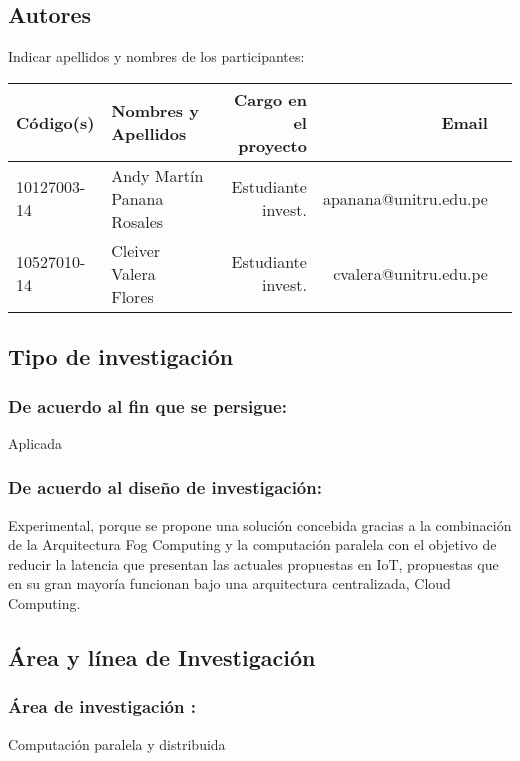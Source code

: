 \subsection{Autores}
Indicar apellidos y nombres de los participantes:
\begin{center}
    \begin{table}[!ht]
        \centering
        \begin{tabular}{llrrr} \toprule
        {\bf Código(s)} & {\bf Nombres y Apellidos} & {\bf Cargo en el proyecto} & {\bf Email} \\ \midrule
        10127003-14 & Andy Martín Panana Rosales & Estudiante invest. & apanana@unitru.edu.pe           \\
        10527010-14    & Cleiver Valera Flores & Estudiante invest. & cvalera@unitru.edu.pe            \\ \bottomrule
        \end{tabular}
    \end{table}
\end{center}

\subsection{Tipo de investigación}
    \subsubsection{De acuerdo al fin que se persigue:} 
    Aplicada
                    
    \subsubsection{De acuerdo al diseño de investigación:} 
    Experimental, porque se propone una solución concebida gracias a la combinación de la Arquitectura Fog Computing y la computación paralela con el objetivo de reducir la latencia que presentan las actuales propuestas en IoT, propuestas que en su gran mayoría funcionan bajo una arquitectura centralizada, Cloud Computing.

\subsection{Área y línea de Investigación}
    \subsubsection{Área de investigación :} 
    Computación paralela y distribuida
    
